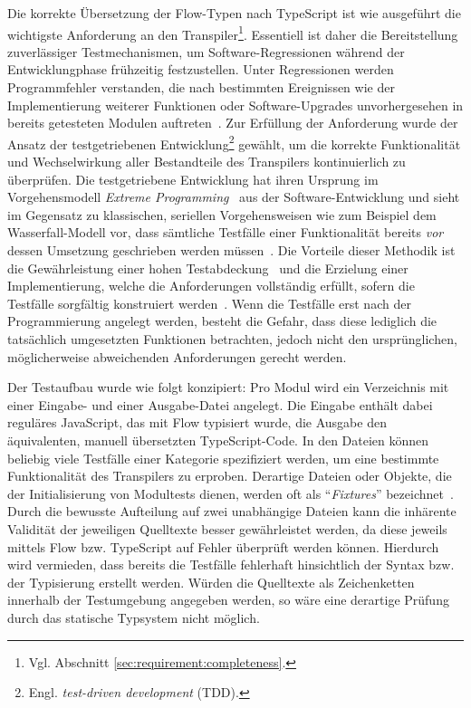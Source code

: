 Die korrekte Übersetzung der Flow-Typen nach TypeScript ist wie ausgeführt die wichtigste Anforderung an den Transpiler\footnote{Vgl. Abschnitt \ref{sec:requirement:completeness}.}. Essentiell ist daher die Bereitstellung zuverlässiger Testmechanismen, um Software-Regressionen während der Entwicklungphase frühzeitig festzustellen. Unter Regressionen werden Programmfehler verstanden, die nach bestimmten Ereignissen wie der Implementierung weiterer Funktionen oder Software-Upgrades unvorhergesehen in bereits getesteten Modulen auftreten~\autocite[218]{DOR:SOFTWARE_TEST}. Zur Erfüllung der Anforderung wurde der Ansatz der testgetriebenen Entwicklung\footnote{Engl. \textit{test-driven development} (TDD).} gewählt, um die korrekte Funktionalität und Wechselwirkung aller Bestandteile des Transpilers kontinuierlich zu überprüfen. Die testgetriebene Entwicklung hat ihren Ursprung im Vorgehensmodell \textit{Extreme Programming}~\autocite{JEFFRIES:EXTREME_PROGRAMMING} aus der Software-Entwicklung und sieht im Gegensatz zu klassischen, seriellen Vorgehensweisen wie zum Beispiel dem Wasserfall-Modell vor, dass sämtliche Testfälle einer Funktionalität bereits \emph{vor} dessen Umsetzung geschrieben werden müssen~\autocite{BECK:EXTREME_PROGRAMMING}. Die Vorteile dieser Methodik ist die Gewährleistung einer hohen Testabdeckung~\autocite[90]{BECK:TDD} und die Erzielung einer Implementierung, welche die Anforderungen vollständig erfüllt, sofern die Testfälle sorgfältig konstruiert werden~\autocite[214]{BECK:TDD}. Wenn die Testfälle erst nach der Programmierung angelegt werden, besteht die Gefahr, dass diese lediglich die tatsächlich umgesetzten Funktionen betrachten, jedoch nicht den ursprünglichen, möglicherweise abweichenden Anforderungen gerecht werden.

Der Testaufbau wurde wie folgt konzipiert: Pro Modul wird ein Verzeichnis mit einer Ein\-gabe- und einer Ausgabe-Datei angelegt. Die Eingabe enthält dabei reguläres JavaScript, das mit Flow typisiert wurde, die Ausgabe den äquivalenten, manuell übersetzten TypeScript-Code. In den Dateien können beliebig viele Testfälle einer Kategorie spezifiziert werden, um eine bestimmte Funktionalität des Transpilers zu erproben. Derartige Dateien oder Objekte, die der Initialisierung von Modultests dienen, werden oft als \enquote{\textit{Fixtures}} bezeichnet~\autocite{OLAN:2003}. Durch die bewusste Aufteilung auf zwei unabhängige Dateien kann die inhärente Validität der jeweiligen Quelltexte besser gewährleistet werden, da diese jeweils mittels Flow bzw. TypeScript auf Fehler überprüft werden können. Hierdurch wird vermieden, dass bereits die Testfälle fehlerhaft hinsichtlich der Syntax bzw. der Typisierung erstellt werden. Würden die Quelltexte als Zeichenketten innerhalb der Testumgebung angegeben werden, so wäre eine derartige Prüfung durch das statische Typsystem nicht möglich.

